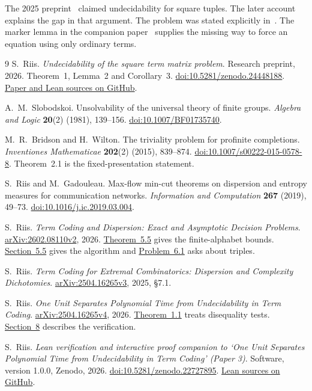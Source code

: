 \documentclass[a4paper,12pt]{article}
\newcommand{\stephead}[1]{\par\smallskip{\large\bfseries\color{inkblue}#1}\par\nobreak}
\begin{document}
\stephead{Where the three-variable question was left open}
The 2025 preprint~\cite[\S7.1]{Early} claimed undecidability for square tuples. The later account~\cite[\S1]{OneUnit} explains the gap in that argument. The problem was stated explicitly in~\cite[Problem~6.1]{TC}. The marker lemma in the companion paper~\cite[Lemma~2]{Square} supplies the missing way to force an equation using only ordinary terms.

\clearpage
\begin{thebibliography}{9}
\setlength{\itemsep}{5pt}
S.~Riis. \emph{Undecidability of the square term matrix problem}. Research preprint, 2026. Theorem~1, Lemma~2 and Corollary~3.
\href{https://doi.org/10.5281/zenodo.24448188}{doi:10.5281/zenodo.24448188}.
\href{https://github.com/SR123/square-term-bijectivity}{Paper and Lean sources on GitHub}.

A.~M.~Slobodskoi. Unsolvability of the universal theory of finite groups. \emph{Algebra and Logic} \textbf{20}(2) (1981), 139--156.
\href{https://doi.org/10.1007/BF01735740}{doi:10.1007/BF01735740}.

M.~R.~Bridson and H.~Wilton. The triviality problem for profinite completions. \emph{Inventiones Mathematicae} \textbf{202}(2) (2015), 839--874.
\href{https://doi.org/10.1007/s00222-015-0578-8}{doi:10.1007/s00222-015-0578-8}.
Theorem~2.1 is the fixed-presentation statement.

S.~Riis and M.~Gadouleau. Max-flow min-cut theorems on dispersion and entropy measures for communication networks. \emph{Information and Computation} \textbf{267} (2019), 49--73.
\href{https://doi.org/10.1016/j.ic.2019.03.004}{doi:10.1016/j.ic.2019.03.004}.

S.~Riis. \emph{Term Coding and Dispersion: Exact and Asymptotic Decision Problems}. \href{https://arxiv.org/abs/2602.08110v2}{arXiv:2602.08110v2}, 2026.
\href{https://arxiv.org/html/2602.08110v2#S5.Thmdefinition5}{Theorem~5.5} gives the finite-alphabet bounds.
\href{https://arxiv.org/html/2602.08110v2#S5.SS5}{Section~5.5} gives the algorithm and
\href{https://arxiv.org/html/2602.08110v2#S6.Thmproblem1}{Problem~6.1} asks about triples.

S.~Riis. \emph{Term Coding for Extremal Combinatorics: Dispersion and Complexity Dichotomies}. \href{https://arxiv.org/abs/2504.16265v3}{arXiv:2504.16265v3}, 2025, \S7.1.

S.~Riis. \emph{One Unit Separates Polynomial Time from Undecidability in Term Coding}. \href{https://arxiv.org/abs/2504.16265v4}{arXiv:2504.16265v4}, 2026.
\href{https://arxiv.org/html/2504.16265v4#S1.Thmtheorem1}{Theorem~1.1} treats disequality tests.
\href{https://arxiv.org/html/2504.16265v4#S8}{Section~8} describes the verification.

S.~Riis. \emph{Lean verification and interactive proof companion to ‘One Unit Separates Polynomial Time from Undecidability in Term Coding’ (Paper 3)}. Software, version 1.0.0, Zenodo, 2026.
\href{https://doi.org/10.5281/zenodo.22727895}{doi:10.5281/zenodo.22727895}.
\href{https://github.com/SR123/term-coding-disequality-lean}{Lean sources on GitHub}.
\end{thebibliography}
\end{document}
